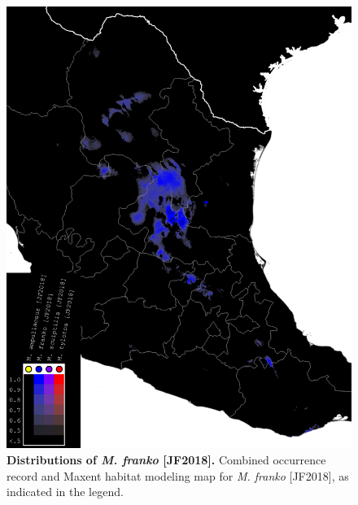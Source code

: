 \documentclass[fleqn,10pt,lineno]{wlpeerj} %
\begin{document}
\begin{figure}[h]
	\centering
	\includegraphics[width=\textwidth]{figure6.png}
	\caption{\textbf{Distributions of \textit{M. franko} [JF2018].} Combined occurrence record and Maxent habitat modeling map for \textit{M. franko} [JF2018], as indicated in the legend.}
	\label{fig:map_franko}
\end{figure}
\end{document}
